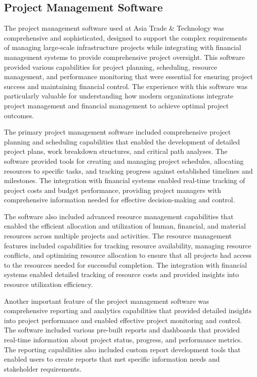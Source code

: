 \subsection{Project Management Software}
The project management software used at Asia Trade \& Technology was comprehensive and sophisticated, designed to support the complex requirements of managing large-scale infrastructure projects while integrating with financial management systems to provide comprehensive project oversight. This software provided various capabilities for project planning, scheduling, resource management, and performance monitoring that were essential for ensuring project success and maintaining financial control. The experience with this software was particularly valuable for understanding how modern organizations integrate project management and financial management to achieve optimal project outcomes.

The primary project management software included comprehensive project planning and scheduling capabilities that enabled the development of detailed project plans, work breakdown structures, and critical path analyses. The software provided tools for creating and managing project schedules, allocating resources to specific tasks, and tracking progress against established timelines and milestones. The integration with financial systems enabled real-time tracking of project costs and budget performance, providing project managers with comprehensive information needed for effective decision-making and control.

The software also included advanced resource management capabilities that enabled the efficient allocation and utilization of human, financial, and material resources across multiple projects and activities. The resource management features included capabilities for tracking resource availability, managing resource conflicts, and optimizing resource allocation to ensure that all projects had access to the resources needed for successful completion. The integration with financial systems enabled detailed tracking of resource costs and provided insights into resource utilization efficiency.

Another important feature of the project management software was comprehensive reporting and analytics capabilities that provided detailed insights into project performance and enabled effective project monitoring and control. The software included various pre-built reports and dashboards that provided real-time information about project status, progress, and performance metrics. The reporting capabilities also included custom report development tools that enabled users to create reports that met specific information needs and stakeholder requirements.

